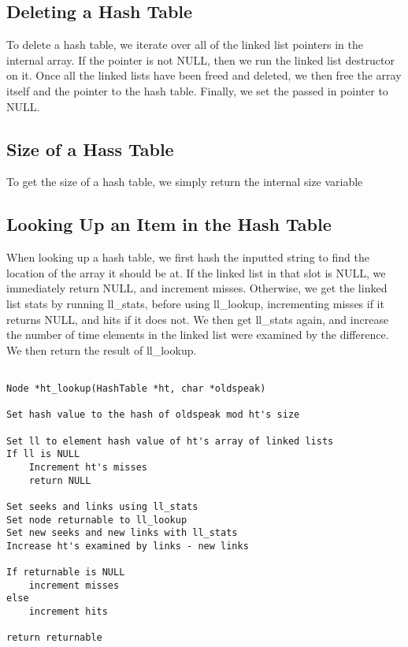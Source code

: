 \documentclass[11pt]{article}
\begin{document}
\subsection{Deleting a Hash Table}

To delete a hash table, we iterate over all of the linked list pointers in the internal array. If the pointer is not NULL, then we run the linked list destructor on it. Once all the linked lists have been freed and deleted, we then free the array itself and the pointer to the hash table. Finally, we set the passed in pointer to NULL.

\subsection{Size of a Hass Table}

To get the size of a hash table, we simply return the internal size variable

\subsection{Looking Up an Item in the Hash Table}

When looking up a hash table, we first hash the inputted string to find the location of the array it should be at. If the linked list in that slot is NULL, we immediately return NULL, and increment misses. Otherwise, we get the linked list stats by running ll\_stats, before using ll\_lookup, incrementing misses if it returns NULL, and hits if it does not. We then get ll\_stats again, and increase the number of time elements in the linked list were examined by the difference. We then return the result of ll\_lookup.

\begin{verbatim}

Node *ht_lookup(HashTable *ht, char *oldspeak)

Set hash value to the hash of oldspeak mod ht's size

Set ll to element hash value of ht's array of linked lists
If ll is NULL
    Increment ht's misses
    return NULL

Set seeks and links using ll_stats
Set node returnable to ll_lookup
Set new seeks and new links with ll_stats
Increase ht's examined by links - new links

If returnable is NULL
    increment misses
else
    increment hits

return returnable

\end{verbatim}
\end{document}
